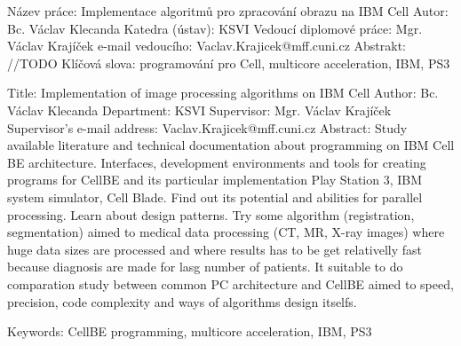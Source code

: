 Název práce:  Implementace algoritmů pro zpracování obrazu na IBM Cell
Autor: Bc. Václav Klecanda
Katedra (ústav): KSVI
Vedoucí diplomové práce: Mgr. Václav Krajíček
e-mail vedoucího: Vaclav.Krajicek@mff.cuni.cz
Abstrakt: //TODO
Klíčová slova: programování pro Cell, multicore acceleration, IBM, PS3


Title:  Implementation of image processing algorithms on IBM Cell
Author: Bc. Václav Klecanda
Department: KSVI
Supervisor: Mgr. Václav Krajíček
Supervisor's e-mail address: Vaclav.Krajicek@mff.cuni.cz
Abstract: Study available literature and technical documentation about programming on IBM Cell BE architecture.
Interfaces, development environments and tools for creating programs for CellBE and its particular implementation Play Station 3, IBM system simulator, Cell Blade.
Find out its potential and abilities for parallel processing. Learn about design patterns.
Try some algorithm (registration, segmentation) aimed to medical data processing (CT, MR, X-ray images) where huge data sizes are processed and where results has to be get relativelly fast because diagnosis are made for lasg number of patients.
It suitable to do comparation study between common PC architecture and CellBE aimed to speed, precision, code complexity and ways of algorithms design itselfs.

Keywords: CellBE programming, multicore acceleration, IBM, PS3